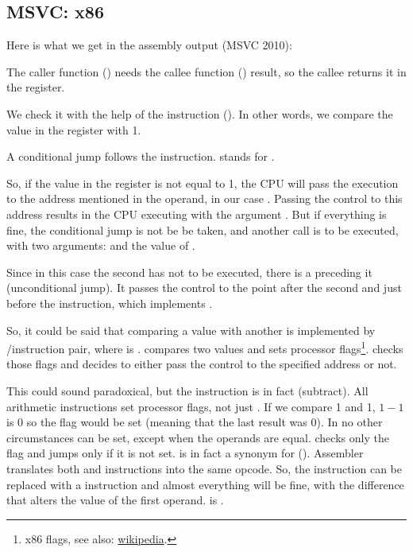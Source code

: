 \subsection{MSVC: x86}

Here is what we get in the assembly output (MSVC 2010):



The \gls{caller} function (\main) needs the \gls{callee} function (\scanf) result, 
so the \gls{callee} returns it in the \EAX register.

We check it with the help of the instruction  (). In other words, we compare the value in the \EAX register with 1.

A \JNE conditional jump follows the \CMP instruction. \JNE stands for .

So, if the value in the \EAX register is not equal to 1, the \ac{CPU} will pass the execution to the address mentioned in the \JNE operand, in our case .
Passing the control to this address results in the \ac{CPU} executing \printf with the argument .
But if everything is fine, the conditional jump is not be be taken, and another \printf call is to be executed, with two arguments:  and the value of .

Since in this case the second \printf has not to be executed, there is a \JMP preceding it (unconditional jump). 
It passes the control to the point after the second \printf and just before the  instruction, which implements .

So, it could be said that comparing a value with another is  implemented by \CMP/\Jcc instruction pair, where  is .
\CMP compares two values and sets processor flags\footnote{x86 flags, see also: \href{http://go.yurichev.com/17120}{wikipedia}.}.
\Jcc checks those flags and decides to either pass the control to the specified address or not.

\label{CMPandSUB}
This could sound paradoxical, but the \CMP instruction is in fact \SUB (subtract).
All arithmetic instructions set processor flags, not just \CMP.
If we compare 1 and 1, $1-1$ is 0 so the \ZF flag would be set (meaning that the last result was 0).
In no other circumstances \ZF can be set, except when the operands are equal.
\JNE checks only the \ZF flag and jumps only if it is not set.  \JNE is in fact a synonym for \JNZ ().
Assembler translates both \JNE and \JNZ instructions into the same opcode.
So, the \CMP instruction can be replaced with a \SUB instruction and almost everything will be fine, with the difference that \SUB alters the value of the first operand.
\CMP is .

